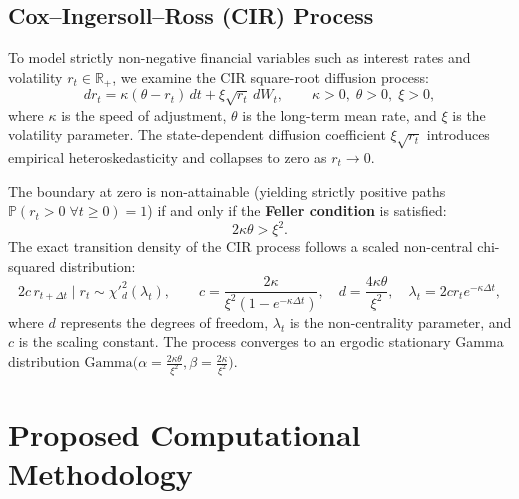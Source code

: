 \documentclass[11pt,a4paper]{article}
\begin{document}
\subsection{Cox--Ingersoll--Ross (CIR) Process}
To model strictly non-negative financial variables such as interest rates and volatility $r_t \in \mathbb{R}_+$, we examine the CIR square-root diffusion process:
\begin{equation}
dr_t = \kappa(\theta - r_t)\,dt + \xi\sqrt{r_t}\,dW_t, \qquad \kappa > 0,\; \theta > 0,\; \xi > 0,
\label{eq:cir_sde}
\end{equation}
where $\kappa$ is the speed of adjustment, $\theta$ is the long-term mean rate, and $\xi$ is the volatility parameter. The state-dependent diffusion coefficient $\xi\sqrt{r_t}$ introduces empirical heteroskedasticity and collapses to zero as $r_t \to 0$.

The boundary at zero is non-attainable (yielding strictly positive paths $\mathbb{P}(r_t > 0 \; \forall t \ge 0) = 1$) if and only if the \textbf{Feller condition} is satisfied:
\begin{equation}
2\kappa\theta > \xi^2.
\label{eq:feller}
\end{equation}
The exact transition density of the CIR process follows a scaled non-central chi-squared distribution:
\begin{equation}
2c\,r_{t+\Delta t} \mid r_t \sim \chi'^2_d(\lambda_t), \qquad c = \frac{2\kappa}{\xi^2(1 - e^{-\kappa\Delta t})}, \quad d = \frac{4\kappa\theta}{\xi^2}, \quad \lambda_t = 2 c r_t e^{-\kappa\Delta t},
\label{eq:cir_trans}
\end{equation}
where $d$ represents the degrees of freedom, $\lambda_t$ is the non-centrality parameter, and $c$ is the scaling constant. The process converges to an ergodic stationary Gamma distribution $\mathrm{Gamma}\bigl(\alpha = \frac{2\kappa\theta}{\xi^2}, \beta = \frac{2\kappa}{\xi^2}\bigr)$.

\section{Proposed Computational Methodology}
\end{document}
